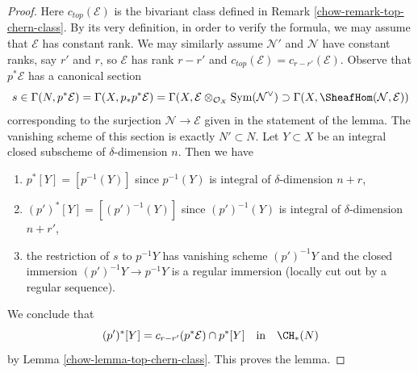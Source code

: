 \begin{proof}

Here $c_{top}(\mathcal{E})$ is the bivariant class defined in
Remark \ref{chow-remark-top-chern-class}. By its very definition, in
order to verify the formula, we may assume that $\mathcal{E}$
has constant rank. We may similarly assume $\mathcal{N}'$ and
$\mathcal{N}$ have constant ranks, say $r'$ and $r$, so
$\mathcal{E}$ has rank $r - r'$ and
$c_{top}(\mathcal{E}) = c_{r - r'}(\mathcal{E})$.
Observe that $p^*\mathcal{E}$ has a canonical section
$$
s \in \Gamma(N, p^*\mathcal{E}) = \Gamma(X, p_*p^*\mathcal{E}) =
\Gamma(X, \mathcal{E} \otimes_{\mathcal{O}_X} \text{Sym}(\mathcal{N}^\vee)
\supset \Gamma(X, \SheafHom(\mathcal{N}, \mathcal{E}))
$$
corresponding to the surjection $\mathcal{N} \to \mathcal{E}$ given
in the statement of the lemma. The vanishing scheme of this section
is exactly $N' \subset N$. Let $Y \subset X$ be an integral closed
subscheme of $\delta$-dimension $n$. Then we have
\begin{enumerate}
\item $p^*[Y] = [p^{-1}(Y)]$ since $p^{-1}(Y)$ is integral of
$\delta$-dimension $n + r$,
\item $(p')^*[Y] = [(p')^{-1}(Y)]$ since $(p')^{-1}(Y)$ is integral of
$\delta$-dimension $n + r'$,
\item the restriction of $s$ to $p^{-1}Y$ has vanishing scheme
$(p')^{-1}Y$ and the closed immersion $(p')^{-1}Y \to p^{-1}Y$
is a regular immersion (locally cut out by a regular sequence).
\end{enumerate}
We conclude that
$$
(p')^*[Y] = c_{r - r'}(p^*\mathcal{E}) \cap p^*[Y]
\quad\text{in}\quad \CH_*(N)
$$
by Lemma \ref{chow-lemma-top-chern-class}. This proves the lemma.
\end{proof}

